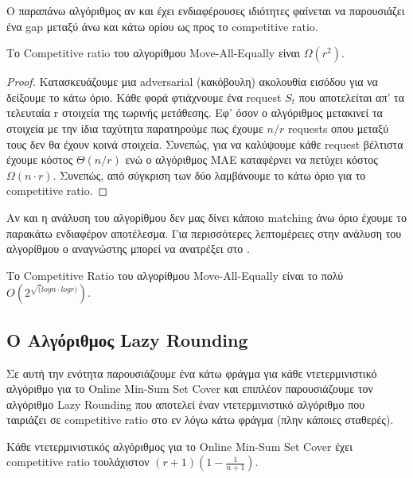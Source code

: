 Ο παραπάνω αλγόριθμος αν και έχει ενδιαφέρουσες ιδιότητες φαίνεται να παρουσιάζει ένα gap μεταξύ άνω και κάτω ορίου ως προς το competitive ratio.

\begin{lemma}
    Το Competitive ratio του αλγορίθμου Move-All-Equally είναι $\Omega( r^2 )$.
\end{lemma}

\begin{proof}
    Κατασκευάζουμε μια adversarial (κακόβουλη) ακολουθία εισόδου για να δείξουμε το κάτω όριο. Κάθε φορά φτιάχνουμε ένα request $S_t$ που αποτελείται απ' τα τελευταία r στοιχεία της τωρινής μετάθεσης. Εφ' όσον ο αλγόριθμος μετακινεί τα στοιχεία με την ίδια ταχύτητα παρατηρούμε πως έχουμε $n/r$ requests οπου μεταξύ τους δεν θα έχουν κοινά στοιχεία. Συνεπώς, για να καλύψουμε κάθε request βέλτιστα έχουμε κόστος $\Theta(n/r)$ ενώ ο αλγόριθμος MAE καταφέρνει να πετύχει κόστος $\Omega(n \cdot r)$. Συνεπώς, από σύγκριση των δύο λαμβάνουμε το κάτω όριο για το competitive ratio.
\end{proof}

Αν και η ανάλυση του αλγορίθμου δεν μας δίνει κάποιο matching άνω όριο έχουμε το παρακάτω ενδιαφέρον αποτέλεσμα. Για περισσότερες λεπτομέρειες στην ανάλυση του αλγορίθμου ο αναγνώστης μπορεί να ανατρέξει στο \cite{FKKSV20}.

\begin{lemma}
    Το Competitive Ratio του αλγορίθμου Move-All-Equally είναι το πολύ $O( 2^{\sqrt( logn \cdot logr ) } ).$
\end{lemma}

\subsection{Ο Αλγόριθμος Lazy Rounding}

Σε αυτή την ενότητα παρουσιάζουμε ένα κάτω φράγμα για κάθε ντετερμινιστικό αλγόριθμο για το Online Min-Sum Set Cover και επιπλέον παρουσιάζουμε τον αλγόριθμο Lazy Rounding που αποτελεί έναν ντετερμινιστικό αλγόριθμο που ταιριάζει σε competitive ratio στο εν λόγω κάτω φράγμα (πλην κάποιες σταθερές).

\begin{theorem}
    Κάθε ντετερμινιστικός αλγόριθμος για το Online Min-Sum Set Cover έχει competitive ratio τουλάχιστον $(r+1)(1 - \frac{1}{n+1})$.
\end{theorem}

